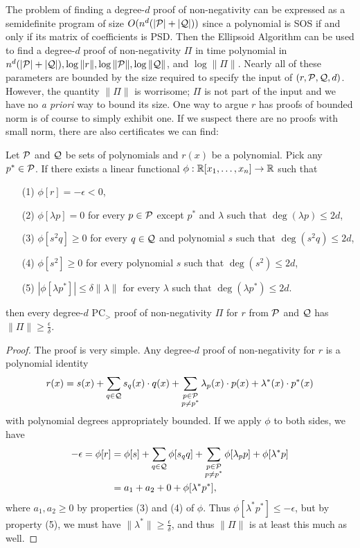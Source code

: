 The problem of finding a degree-$d$ proof of non-negativity can be expressed as a semidefinite program of size $O(n^d(|\mathcal P|+|\mathcal Q|))$ since a polynomial is SOS if and only if its matrix of coefficients is PSD. Then the Ellipsoid Algorithm can be used to find a degree-$d$ proof of non-negativity $\Pi$ in time polynomial in $n^{d}(|\mathcal P|+|\mathcal Q|), \log \|r\|, \log \|\mathcal P\|, \log \|\mathcal Q\|$,  and $\log \|\Pi\|$. Nearly all of these parameters are bounded by the size required to specify the input of $(r,\mathcal P,\mathcal Q,d)$. However, the quantity $\|\Pi\|$ is worrisome; $\Pi$ is not part of the input and we have no \emph{a priori} way to bound its size. One way to argue $r$ has proofs of bounded norm is of course to simply exhibit one. If we suspect there are no proofs with small norm, there are also certificates we can find:
\begin{lemma}\label{lem:prelim_dual_cert}
Let $\mathcal P$ and $\mathcal Q$ be sets of polynomials and $r(x)$ be a polynomial. Pick any $p^* \in \mathcal P$. If there exists a linear functional $\phi: \mathbb R[x_1,\dots,x_n] \rightarrow \mathbb R$ such that
\begin{enumerate}
\item[(1)] $\phi[r] = -\epsilon < 0$,
\item[(2)] $\phi[\lambda p] = 0$ for every $p \in \mathcal P$ except $p^*$ and $\lambda$ such that $\deg (\lambda p) \leq 2d$,
\item[(3)] $\phi[s^2q] \geq 0$ for every $q \in \mathcal Q$ and polynomial $s$ such that $\deg (s^2q) \leq 2d$,
\item[(4)] $\phi[s^2] \geq 0$ for every polynomial $s$ such that $\deg (s^2) \leq 2d$,
\item[(5)] $|\phi[\lambda p^*]| \leq \delta \|\lambda\|$ for every $\lambda$ such that $\deg (\lambda p^*) \leq 2d$. %
\end{enumerate}
then every degree-$d$ PC$_>$ proof of non-negativity $\Pi$ for $r$ from $\mathcal P$ and $\mathcal Q$ has $\|\Pi\| \geq \frac{\epsilon}{\delta}$.
\end{lemma}
\begin{proof}
The proof is very simple. Any degree-$d$ proof of non-negativity for $r$ is a polynomial identity
\[r(x) = s(x) + \sum_{q \in \mathcal Q} s_q(x)\cdot q(x) + \sum_{\substack{p \in \mathcal P \\ p \neq p^*}} \lambda_p(x) \cdot p(x) + \lambda^*(x) \cdot p^*(x)\]
with polynomial degrees appropriately bounded. If we apply $\phi$ to both sides, we have
\begin{align*}
-\epsilon = \phi[r] &= \phi[s] + \sum_{q \in \mathcal Q} \phi[s_qq] + \sum_{\substack{p \in \mathcal P \\ p \neq p^*}} \phi[\lambda_p p] + \phi[\lambda^*p] \\
&= a_1 + a_2 + 0 + \phi[\lambda^* p^*],
\end{align*}
where $a_1,a_2 \geq 0$ by properties (3) and (4) of $\phi$. Thus $\phi[\lambda^* p^*] \leq -\epsilon$, but by property (5), we must have $\|\lambda^*\| \geq \frac{\epsilon}{\delta}$, and thus $\|\Pi\|$ is at least this much as well.
\end{proof}
